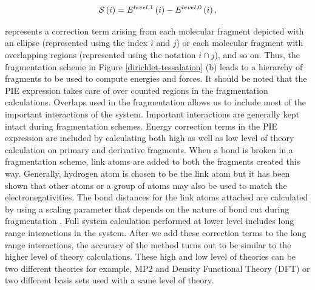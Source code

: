 \begin{equation}
{\cal S}\left(i\right) = E^{level,1}\left(i \right)-E^{level,0}\left(i\right),
\label{oniombasic-2}
\end{equation}

\noindent represents a correction term arising from each molecular fragment
depicted with an ellipse (represented using the index $i$ and $j$) or each
molecular fragment with overlapping regions (represented using the notation
$i\cap j$), and so on. Thus, the fragmentation scheme in Figure \ref{dirichlet-tessalation}
(b) leads to a hierarchy of fragments to be used to compute energies and forces.
It should be noted that the PIE expression takes care of over counted regions
in the fragmentation calculations. Overlaps used in the fragmentation allows
us to include most of the important interactions of the system. Important
interactions are generally kept intact during fragmentation schemes. Energy
correction terms in the PIE expression are included by calculating both high
as well as low level of theory calculation on primary and derivative
fragments. When a bond is broken in a fragmentation scheme, link atoms are
added to both the fragments created this way. Generally, hydrogen atom is
chosen to be the link atom but it has been shown \cite{qwaimdqmmm} that other
atoms or a group of atoms may also be used to match the electronegativities.
The bond distances for the link atoms attached are calculated by using
a scaling parameter that depends on the nature of bond cut during fragmentation
\cite{dapprich1999new}. Full system calculation performed at lower level
includes long range interactions in the system. After we add these correction
terms to the long range interactions, the accuracy of the method turns out
to be similar to the higher level of theory calculations. These high and low
level of theories can be two different theories for example, MP2
and Density Functional Theory (DFT) or two
different basis sets used with a same level of theory.


